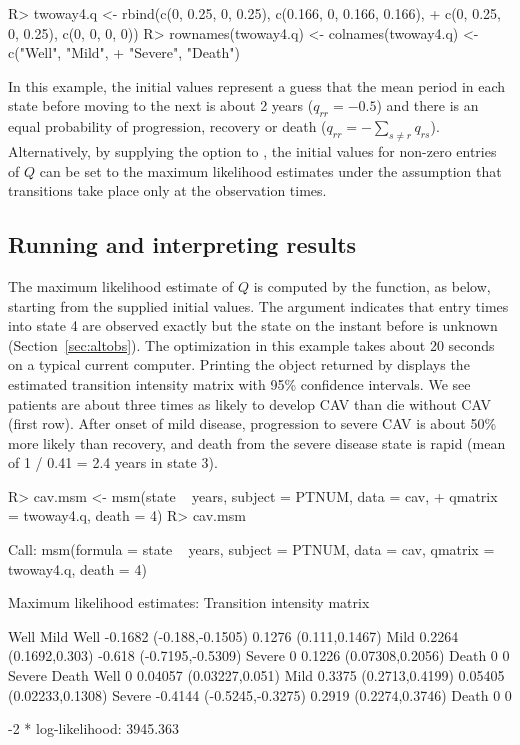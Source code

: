 \documentclass[article,shortnames]{jss}
\begin{document}
\begin{CodeInput}
R> twoway4.q <- rbind(c(0, 0.25, 0, 0.25), c(0.166, 0, 0.166, 0.166),
+    c(0, 0.25, 0, 0.25), c(0, 0, 0, 0))
R> rownames(twoway4.q) <- colnames(twoway4.q) <- c("Well", "Mild",
+    "Severe", "Death")
\end{CodeInput}

In this example, the initial values represent a guess that the mean
period in each state before moving to the next is about 2 years
($q_{rr}=-0.5$) and there is an equal probability of progression,
recovery or death ($q_{rr}=-\sum_{s \neq r} q_{rs}$).  Alternatively,
by supplying the option  to , the
initial values for non-zero entries of $Q$ can be set to the maximum
likelihood estimates under the assumption that transitions take place
only at the observation times.

\subsection[Running msm and interpreting results]{Running  and interpreting results}
\label{sec:runningmsm}

The maximum likelihood estimate of $Q$ is computed by the 
function, as below, starting from the supplied initial values. The
argument  indicates that entry times into state 4 are
observed exactly but the state on the instant before is unknown
(Section~\ref{sec:altobs}).  The optimization in this example takes
about 20 seconds on a typical current computer. Printing the object
 returned by  displays the estimated
transition intensity matrix with 95\% confidence intervals.  We see
patients are about three times as likely to develop CAV than die
without CAV (first row).  After onset of mild disease, progression to
severe CAV is about 50\% more likely than recovery, and death from the
severe disease state is rapid (mean of 1 / 0.41 = 2.4 years in state
3).

\begin{CodeChunk}
\begin{CodeInput}
R> cav.msm <- msm(state ~ years, subject = PTNUM, data = cav,
+    qmatrix = twoway4.q, death = 4)
R> cav.msm
\end{CodeInput}
\begin{CodeOutput}
Call:
msm(formula = state ~ years, subject = PTNUM, data = cav,
    qmatrix = twoway4.q, death = 4)

Maximum likelihood estimates:
Transition intensity matrix

       Well                     Mild
Well   -0.1682 (-0.188,-0.1505) 0.1276 (0.111,0.1467)
Mild   0.2264 (0.1692,0.303)    -0.618 (-0.7195,-0.5309)
Severe 0                        0.1226 (0.07308,0.2056)
Death  0                        0
       Severe                    Death
Well   0                         0.04057 (0.03227,0.051)
Mild   0.3375 (0.2713,0.4199)    0.05405 (0.02233,0.1308)
Severe -0.4144 (-0.5245,-0.3275) 0.2919 (0.2274,0.3746)
Death  0                         0

-2 * log-likelihood:  3945.363
\end{CodeOutput}
\end{CodeChunk}
\end{document}
